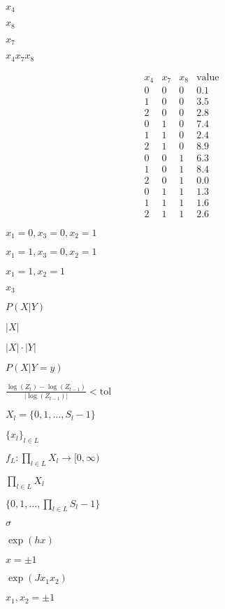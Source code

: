 \documentclass{article}
\begin{document}
$x_4$
\pagebreak

$x_8$
\pagebreak

$x_7$
\pagebreak

$x_4 x_7 x_8$
\pagebreak

\[
\begin{array}{ccc|c}
x_4 & x_7 & x_8 & \mbox{value}\\
\hline
 0 & 0 & 0  &  0.1\\
 1 & 0 & 0  &  3.5\\
 2 & 0 & 0  &  2.8\\
 0 & 1 & 0  &  7.4\\
 1 & 1 & 0  &  2.4\\
 2 & 1 & 0  &  8.9\\
 0 & 0 & 1  &  6.3\\
 1 & 0 & 1  &  8.4\\
 2 & 0 & 1  &  0.0\\
 0 & 1 & 1  &  1.3\\
 1 & 1 & 1  &  1.6\\
 2 & 1 & 1  &  2.6
\end{array}
\]
\pagebreak

$x_1 = 0, x_3 = 0, x_2 = 1$
\pagebreak

$x_1 = 1, x_3 = 0, x_2 = 1$
\pagebreak

$x_1 = 1, x_2 = 1$
\pagebreak

$x_3$
\pagebreak

$ P( X | Y ) $
\pagebreak

$ | X | $
\pagebreak

$ |X| \cdot |Y| $
\pagebreak

$ P(X | Y=y) $
\pagebreak

$ \frac{\log(Z_t) - \log(Z_{t-1})}{| \log(Z_{t-1}) | } < \mathrm{tol} $
\pagebreak

$X_l = \{0,1,\dots,S_l-1\}$
\pagebreak

$\{x_l\}_{l\in L}$
\pagebreak

$f_L : \prod_{l\in L} X_l \to [0,\infty)$
\pagebreak

$\prod_{l\in L} X_l$
\pagebreak

$\{0,1,\dots,\prod_{l\in L} S_l-1\}$
\pagebreak

$\sigma$
\pagebreak

$ \exp(hx) $
\pagebreak

$ x = \pm 1 $
\pagebreak

$ \exp(J x_1 x_2) $
\pagebreak

$ x_1, x_2 = \pm 1 $
\pagebreak
\end{document}
